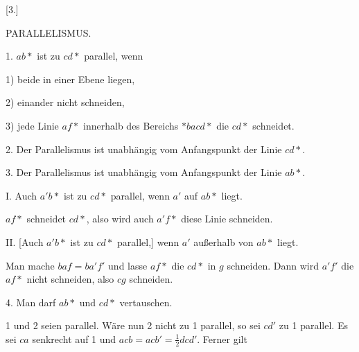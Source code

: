 \begin{center}
[3.]

PARALLELISMUS.
\end{center}

1. $ab\ast $ ist zu $cd\ast $ parallel, wenn

1) beide in einer Ebene liegen,

2) einander nicht schneiden,

3) jede Linie $af\ast $ innerhalb des Bereichs $\ast bacd\ast $ die $cd\ast $ schneidet.

\begin{center}

\end{center}

2. Der Parallelismus ist unabhängig vom Anfangspunkt der Linie $cd\ast $.

3. Der Parallelismus ist unabhängig vom Anfangspunkt der Linie $ab\ast $.

I. Auch $a'b\ast $ ist zu $cd\ast $ parallel, wenn $a'$ auf $ab\ast $ liegt.

 $af\ast $ schneidet $cd\ast $, also wird auch $a'f\ast $ diese Linie schneiden.

II. [Auch $a'b\ast $ ist zu $cd\ast $ parallel,] wenn $a'$ außerhalb von $ab\ast $ liegt.

\begin{center}

\end{center}

Man mache $baf = ba'f'$ und lasse $af\ast $ die $cd\ast $ in $g$ schneiden. Dann wird $a'f'$ die $af\ast $ nicht schneiden, also $cg$ schneiden.

4. Man darf $ab\ast $ und $cd\ast $ vertauschen.

\begin{center}

\end{center}

1 und 2 seien parallel. Wäre nun 2 nicht zu 1 parallel, so sei $cd'$ zu 1 parallel. Es sei $ca$ senkrecht auf 1 und $acb = acb' = \frac{1}{2}dcd'$. Ferner gilt
